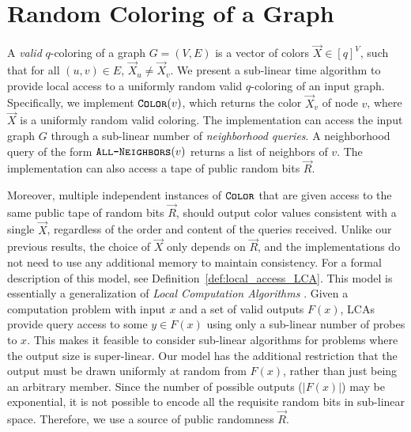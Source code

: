 \section{Random Coloring of a Graph}%
\label{sec:random_coloring_of_a_graph}
A \emph{valid} $q$-coloring of a graph $G=(V, E)$ is a vector of colors $\vec X \in [q]^V$, such that for all $(u,v)\in E$, $\vec X_u \not= \vec X_v$.
We present a sub-linear time algorithm to provide local access to a uniformly random valid $q$-coloring of an input graph.
Specifically, we implement $\texttt{\textsc{Color}}(v)$, which returns the color $\vec X_v$ of node $v$, where $\vec X$ is a uniformly random valid coloring.
The implementation can access the input graph $G$ through a sub-linear number of \emph{neighborhood queries}.
A neighborhood query of the form $\texttt{\textsc{All-Neighbors}}(v)$ returns a list of neighbors of $v$.
The implementation can also access a tape of public random bits $\vec R$.

Moreover, multiple independent instances of $\texttt{\textsc{Color}}$ that are given access to the same public tape of random bits $\vec R$,
should output color values consistent with a single $\vec X$, regardless of the order and content of the queries received.
Unlike our previous results, the choice of $\vec X$ only depends on $\vec R$,
and the  implementations do not need to use any additional memory to maintain consistency.
For a formal description of this model, see Definition~\ref{def:local_access_LCA}.
This model is essentially a generalization of \emph{Local Computation Algorithms} \cite{LCA}.
Given a computation problem with input $x$ and a set of valid outputs $F(x)$,
LCAs provide query access to some $y\in F(x)$ using only a sub-linear number of probes to $x$.
This makes it feasible to consider sub-linear algorithms for problems where the output size is super-linear.
Our model has the additional restriction that the output must be drawn uniformly at random from $F(x)$, rather than just being an arbitrary member.
Since the number of possible outputs ($|F(x)|$) may be exponential, it is not possible to encode all the requisite random bits in sub-linear space.
Therefore, we use a source of public randomness $\vec R$.

